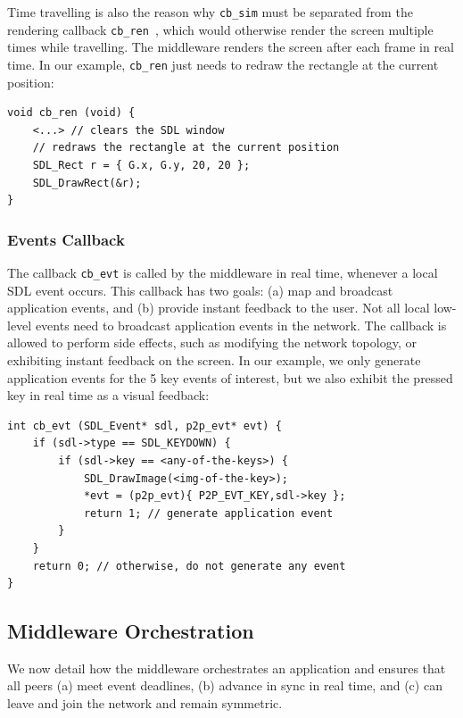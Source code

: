 \documentclass[12pt]{article}
\newcommand{\code}[1]  {\texttt{\small{#1}}}
\begin{document}
Time travelling is also the reason why \code{cb\_sim} must be separated from
the rendering callback \code{cb\_ren}~\cite{tml.js}, which would otherwise
render the screen multiple times while travelling.
The middleware renders the screen after each frame in real time.
In our example, \code{cb\_ren} just needs to redraw the rectangle at the
current position:

{\footnotesize
\begin{verbatim}
void cb_ren (void) {
    <...> // clears the SDL window
    // redraws the rectangle at the current position
    SDL_Rect r = { G.x, G.y, 20, 20 };
    SDL_DrawRect(&r);
}
\end{verbatim}
}

\subsubsection{Events Callback}
\label{sec.tml.api.cb_evt}

The callback \code{cb\_evt} is called by the middleware in real time, whenever
a local SDL event occurs.
This callback has two goals:
    (a) map and broadcast application events, and
    (b) provide instant feedback to the user.
Not all local low-level events need to broadcast application events in the
network.
The callback is allowed to perform side effects, such as modifying the network
topology, or exhibiting instant feedback on the screen.
In our example, we only generate application events for the 5 key events of
interest, but we also exhibit the pressed key in real time as a visual
feedback:

{\footnotesize
\begin{verbatim}
int cb_evt (SDL_Event* sdl, p2p_evt* evt) {
    if (sdl->type == SDL_KEYDOWN) {
        if (sdl->key == <any-of-the-keys>) {
            SDL_DrawImage(<img-of-the-key>);
            *evt = (p2p_evt){ P2P_EVT_KEY,sdl->key };
            return 1; // generate application event
        }
    }
    return 0; // otherwise, do not generate any event
}
\end{verbatim}
}

\subsection{Middleware Orchestration}
\label{sec.tml.middleware}

We now detail how the middleware orchestrates an application and ensures that
all peers
    (a) meet event deadlines,
    (b) advance in sync in real time, and
    (c) can leave and join the network and remain symmetric.
\end{document}
